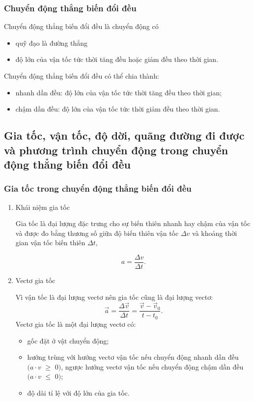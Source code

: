 \subsubsection{Chuyển động thẳng biến đổi đều}

Chuyển động thẳng biến đổi đều là chuyển động có 
	\begin{itemize}
		\item quỹ đạo là đường thẳng
		\item độ lớn của vận tốc tức thời tăng đều hoặc giảm đều theo thời gian.
	\end{itemize}  

Chuyển động thẳng biến đổi đều có thể chia thành:
\begin{itemize}
	\item nhanh dần đều: độ lớn của vận tốc tức thời tăng đều theo thời gian;
	\item chậm dần đều: độ lớn của vận tốc tức thời giảm đều theo thời gian.
\end{itemize}
\subsection{Gia tốc, vận tốc, độ dời, quãng đường đi được và phương trình chuyển động trong chuyển động thẳng biến đổi đều}
\vspace{-1em}
\subsubsection{Gia tốc trong chuyển động thẳng biến đổi đều}
\begin{enumerate}[label=\alph*)]
	\item Khái niệm gia tốc
	
	Gia tốc là đại lượng đặc trưng cho sự biến thiên nhanh hay chậm của vận tốc và được đo bằng thương số giữa độ biến thiên vận tốc $\Delta v$ và khoảng thời gian vận tốc biến thiên $\Delta t$,
	
	\begin{equation*}
		a=\dfrac{\Delta v}{\Delta t}.
	\end{equation*}	
	\item Vectơ gia tốc
	
	Vì vận tốc là đại lượng vectơ nên gia tốc cũng là đại lượng vectơ:
	\begin{equation*}
		\vec{a}=\dfrac{\Delta\vec{v}}{\Delta t}=\dfrac{\vec{v}-\vec{v}_0}{t-t_0}.
	\end{equation*}
	Vectơ gia tốc là một đại lượng vectơ có:
	\begin{itemize}
		\item gốc đặt ở vật chuyển động;
		\item hướng trùng với hướng vectơ vận tốc nếu chuyển động nhanh dần đều $(a\cdot v$ $\geq$ $0)$, ngược hướng vectơ vận tốc nếu chuyển động chậm dần đều $(a\cdot v$ $\leq$ $ 0)$;
		\item độ dài tỉ lệ với độ lớn của gia tốc.
	\end{itemize}
\end{enumerate}	
